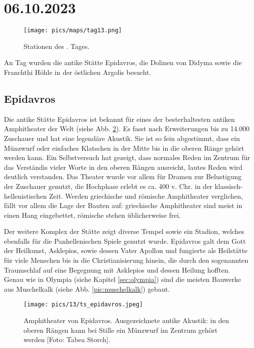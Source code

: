 \documentclass[preprint]{geomorphica} %
\begin{document}
\section{06.10.2023}

\begin{figure}[h]
    \centering
    \texttt{[image: pics/maps/tag13.png]}
    \caption{Stationen des \theday. Tages.}
    \label{pic:tag13}
\end{figure}

An Tag \theday wurden die antike Stätte Epidavros, die Dolinen von Didyma sowie die Franchthi Höhle in der östlichen Argolis besucht.

\subsection{Epidavros}

Die antike Stätte Epidavros ist bekannt für eines der besterhaltesten antiken Amphitheater der Welt (siehe Abb. \ref{pic:epidavros}). Es fasst nach Erweiterungen bis zu 14.000 Zuschauer und hat eine legendäre Akustik. Sie ist so fein abgestimmt, dass ein Münzwurf oder einfaches Klatschen in der Mitte bis in die oberen Ränge gehört werden kann. Ein Selbstversuch hat gezeigt, dass normales Reden im Zentrum für das Verständis vieler Worte in den oberen Rängen ausreicht, lautes Reden wird deutlich verstanden. Das Theater wurde vor allem für Dramen zur Belustigung der Zuschauer genutzt, die Hochphase erlebt es ca. 400 v. Chr. in der klassisch-hellenistischen Zeit. Werden griechische und römische Amphitheater verglichen, fällt vor allem die Lage der Bauten auf: griechische Amphitheater sind meist in einen Hang eingebettet, römische stehen üblicherweise frei.

Der weitere Komplex der Stätte zeigt diverse Tempel sowie ein Stadion, welches ebenfalls für die Panhellenischen Spiele genutzt wurde. Epidavros galt dem Gott der Heilkunst, Asklepios, sowie dessen Vater Apollon und fungierte als Heilstätte für viele Menschen bis in die Christianisierung hinein, die durch den sogenannten Traumschlaf auf eine Begegnung mit Asklepios und dessen Heilung hofften. Genau wie in Olympia (siehe Kapitel \ref{sec:olympia}) sind die meisten Bauwerke aus Muschelkalk (siehe Abb. \ref{pic:muschelkalk}) gebaut.

\begin{figure}[h]
    \centering
    \texttt{[image: pics/13/ts\_epidavros.jpeg]}
    \caption{Amphitheater von Epidavros. Ausgezeichnete antike Akustik: in den oberen Rängen kann bei Stille ein Münzwurf im Zentrum gehört werden [Foto: Tabea Storch].}
    \label{pic:epidavros}
\end{figure}
\end{document}
